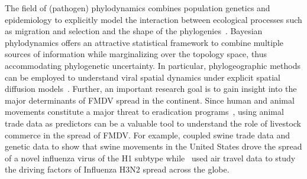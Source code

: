 \documentclass[10pt]{article}
\begin{document}
The field of (pathogen) phylodynamics combines population genetics and epidemiology to explicitly  model the interaction between ecological processes such as migration and selection and the shape of the phylogenies~\citep{Grenfell2004, Volz2013, Dudas2017}.
Bayesian phylodynamics offers an attractive statistical framework to combine multiple sources of information while marginalizing over the topology space, thus accommodating phylogenetic uncertainty.
In particular, phylogeographic methods can be employed to understand viral spatial dynamics under explicit spatial diffusion models~\citep{Lemey2009}.
Further, an important research goal is to gain insight into the major determinants of FMDV spread in the continent.
Since human and animal movements constitute a major threat to eradication programs~\citep{Schley2009}, using animal trade data as predictors can be a valuable tool to understand the role of livestock commerce in the spread of FMDV.
For example, \citet{Nelson2011} coupled swine trade data and genetic data to show that swine movements in the United States drove the spread of a novel influenza virus of the H1 subtype while~\cite{Lemey2014} used air travel data to study the driving factors of Influenza H3N2 spread across the globe. 
\end{document}
